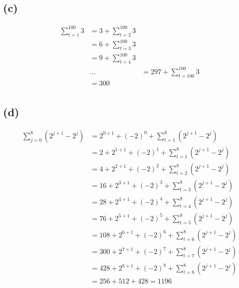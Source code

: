 \documentclass{article}
\begin{document}
\subsection*{(c)}
\begin{equation} \label{eq3}
\begin{split}
\sum\limits_{t=1}^{100}3 & =  3 + \sum\limits_{t=2}^{100}3 \\
& = 6 + \sum\limits_{t=3}^{100}3 \\
& = 9 + \sum\limits_{t=4}^{100}3 \\
& ...
& = 297 + \sum\limits_{t=100}^{100}3 \\
& = 300 \\
\end{split}
\end{equation}


\subsection*{(d)}
\begin{equation} \label{eq4}
\begin{split}
\sum\limits_{j=0}^{8}(2^{j+1} - 2^j) & =  2^{0+1} + (-2)^0 + \sum\limits_{t=1}^{8}(2^{j+1} - 2^j) \\
& =  2 + 2^{1+1} + (-2)^1 + \sum\limits_{t=1}^{8}(2^{j+1} - 2^j) \\
& =  4 + 2^{2+1} + (-2)^2 + \sum\limits_{t=2}^{8}(2^{j+1} - 2^j) \\
& =  16 + 2^{3+1} + (-2)^3 + \sum\limits_{t=3}^{8}(2^{j+1} - 2^j) \\
& =  28 + 2^{4+1} + (-2)^4 + \sum\limits_{t=4}^{8}(2^{j+1} - 2^j) \\
& =  76 + 2^{5+1} + (-2)^5 + \sum\limits_{t=5}^{8}(2^{j+1} - 2^j) \\
& =  108 + 2^{6+1} + (-2)^6 + \sum\limits_{t=6}^{8}(2^{j+1} - 2^j) \\
& =  300 + 2^{7+1} + (-2)^7 + \sum\limits_{t=7}^{8}(2^{j+1} - 2^j) \\
& =  428 + 2^{8+1} + (-2)^8 + \sum\limits_{t=8}^{8}(2^{j+1} - 2^j) \\
& =  256+512+428 = 1196
\end{split}
\end{equation}
\end{document}
